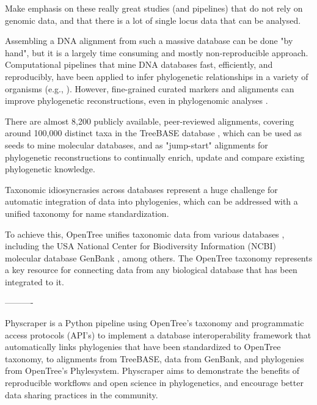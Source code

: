 \documentclass{bmcart}
\begin{document}
Make emphasis on these really great studies (and pipelines) that do not rely on
genomic data, and that there is a lot of single locus data that can be analysed.

Assembling a DNA alignment from such a massive database can be done "by hand",
but it is a largely time consuming and mostly non-reproducible approach.
Computational pipelines that mine DNA databases fast, efficiently, and reproducibly,
have been applied to infer phylogenetic relationships in a variety of organisms
(e.g., \cite{smith2009mega, antonelli2017toward, izquierdo2014pumper}).
However, fine-grained curated markers and alignments can improve phylogenetic
reconstructions, even in phylogenomic analyses \cite{fragoso2017pilot}.

There are almost 8,200 publicly available, peer-reviewed alignments, covering
around 100,000 distinct taxa in the TreeBASE database \cite{piel2009treebase}, which
can be used as seeds to mine molecular databases, and as "jump-start" alignments
for phylogenetic reconstructions \cite{morrison2006multiple} to continually enrich,
update and compare existing phylogenetic knowledge.





Taxonomic idiosyncrasies across databases represent a huge challenge for automatic
integration of data into phylogenies, which can be addressed with a unified
taxonomy for name standardization.

To achieve this, OpenTree unifies taxonomic
data from various databases \cite{rees2017automated}, including the USA National
Center for Biodiversity Information (NCBI) molecular database GenBank
\cite{benson2000genbank}, among others. The OpenTree taxonomy represents a key resource
for connecting data from any biological database that has been integrated to it.

----------





Physcraper is a Python pipeline using OpenTree's taxonomy and programmatic access
protocols (API's) to implement a database interoperability framework that automatically
links phylogenies that have been standardized to OpenTree taxonomy, to alignments
from TreeBASE, data from GenBank, and phylogenies from OpenTree's Phylesystem.
Physcraper aims to demonstrate the benefits of reproducible workflows and open
science in phylogenetics, and encourage better data sharing practices in the community.
\end{document}
